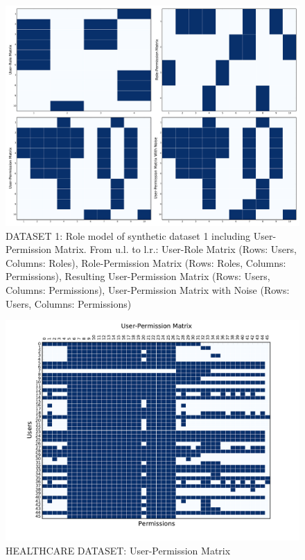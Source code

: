\begin{figure}[H]
    \centering
    \includegraphics[scale=0.3]{./Figures/dataset1}
    \caption{DATASET 1: Role model of synthetic dataset 1 including User-Permission Matrix. From u.l. to l.r.: User-Role Matrix (Rows: Users, Columns: Roles), Role-Permission Matrix (Rows: Roles, Columns: Permissions), Resulting User-Permission Matrix (Rows: Users, Columns: Permissions), User-Permission Matrix with Noise (Rows: Users, Columns: Permissions)}
    \label{fig:dataset1}
\end{figure}

\begin{figure}[H]
    \centering
    \includegraphics[scale=0.7]{./Figures/healthcare}
    \caption{HEALTHCARE DATASET: User-Permission Matrix}
    \label{fig:healthcare}
\end{figure}

